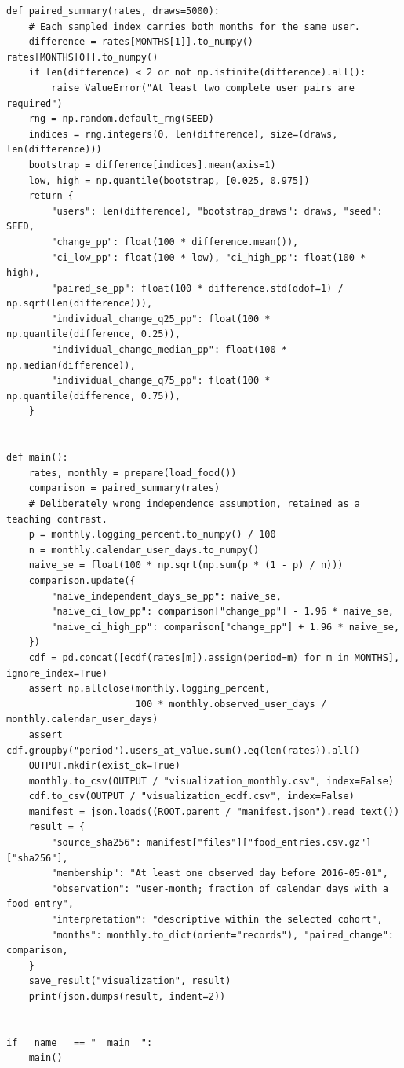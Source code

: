 \begin{Verbatim}[breaklines,breakanywhere,fontsize=\small]
def paired_summary(rates, draws=5000):
    # Each sampled index carries both months for the same user.
    difference = rates[MONTHS[1]].to_numpy() - rates[MONTHS[0]].to_numpy()
    if len(difference) < 2 or not np.isfinite(difference).all():
        raise ValueError("At least two complete user pairs are required")
    rng = np.random.default_rng(SEED)
    indices = rng.integers(0, len(difference), size=(draws, len(difference)))
    bootstrap = difference[indices].mean(axis=1)
    low, high = np.quantile(bootstrap, [0.025, 0.975])
    return {
        "users": len(difference), "bootstrap_draws": draws, "seed": SEED,
        "change_pp": float(100 * difference.mean()),
        "ci_low_pp": float(100 * low), "ci_high_pp": float(100 * high),
        "paired_se_pp": float(100 * difference.std(ddof=1) / np.sqrt(len(difference))),
        "individual_change_q25_pp": float(100 * np.quantile(difference, 0.25)),
        "individual_change_median_pp": float(100 * np.median(difference)),
        "individual_change_q75_pp": float(100 * np.quantile(difference, 0.75)),
    }


def main():
    rates, monthly = prepare(load_food())
    comparison = paired_summary(rates)
    # Deliberately wrong independence assumption, retained as a teaching contrast.
    p = monthly.logging_percent.to_numpy() / 100
    n = monthly.calendar_user_days.to_numpy()
    naive_se = float(100 * np.sqrt(np.sum(p * (1 - p) / n)))
    comparison.update({
        "naive_independent_days_se_pp": naive_se,
        "naive_ci_low_pp": comparison["change_pp"] - 1.96 * naive_se,
        "naive_ci_high_pp": comparison["change_pp"] + 1.96 * naive_se,
    })
    cdf = pd.concat([ecdf(rates[m]).assign(period=m) for m in MONTHS], ignore_index=True)
    assert np.allclose(monthly.logging_percent,
                       100 * monthly.observed_user_days / monthly.calendar_user_days)
    assert cdf.groupby("period").users_at_value.sum().eq(len(rates)).all()
    OUTPUT.mkdir(exist_ok=True)
    monthly.to_csv(OUTPUT / "visualization_monthly.csv", index=False)
    cdf.to_csv(OUTPUT / "visualization_ecdf.csv", index=False)
    manifest = json.loads((ROOT.parent / "manifest.json").read_text())
    result = {
        "source_sha256": manifest["files"]["food_entries.csv.gz"]["sha256"],
        "membership": "At least one observed day before 2016-05-01",
        "observation": "user-month; fraction of calendar days with a food entry",
        "interpretation": "descriptive within the selected cohort",
        "months": monthly.to_dict(orient="records"), "paired_change": comparison,
    }
    save_result("visualization", result)
    print(json.dumps(result, indent=2))


if __name__ == "__main__":
    main()
\end{Verbatim}

